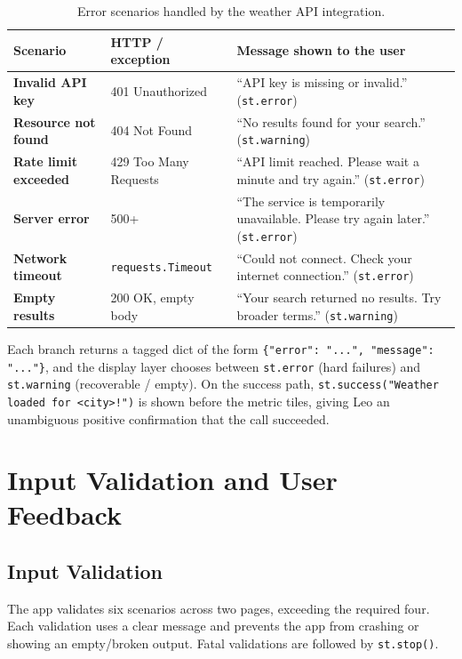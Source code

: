 \documentclass[11pt]{article}
\begin{document}
\begin{table}[h!]
\centering
\begin{tabularx}{\textwidth}{>{\bfseries}l l X}
\toprule
Scenario & HTTP / exception & Message shown to the user \\
\midrule
Invalid API key & 401 Unauthorized & ``API key is missing or invalid.'' (\texttt{st.error}) \\
Resource not found & 404 Not Found & ``No results found for your search.'' (\texttt{st.warning}) \\
Rate limit exceeded & 429 Too Many Requests & ``API limit reached. Please wait a minute and try again.'' (\texttt{st.error}) \\
Server error & 500+ & ``The service is temporarily unavailable. Please try again later.'' (\texttt{st.error}) \\
Network timeout & \texttt{requests.Timeout} & ``Could not connect. Check your internet connection.'' (\texttt{st.error}) \\
Empty results & 200 OK, empty body & ``Your search returned no results. Try broader terms.'' (\texttt{st.warning}) \\
\bottomrule
\end{tabularx}
\caption{Error scenarios handled by the weather API integration.}
\end{table}

Each branch returns a tagged dict of the form \texttt{\{"error": "...", "message": "..."\}}, and the display layer chooses between \texttt{st.error} (hard failures) and \texttt{st.warning} (recoverable / empty). On the success path, \texttt{st.success("Weather loaded for <city>!")} is shown before the metric tiles, giving Leo an unambiguous positive confirmation that the call succeeded.

\section{Input Validation and User Feedback}

\subsection{Input Validation}

The app validates six scenarios across two pages, exceeding the required four. Each validation uses a clear message and prevents the app from crashing or showing an empty/broken output. Fatal validations are followed by \texttt{st.stop()}.
\end{document}
